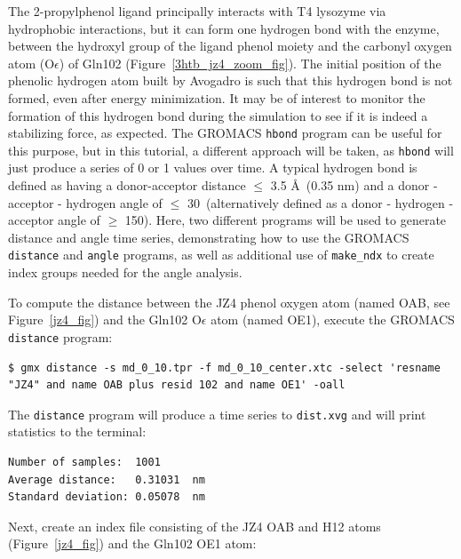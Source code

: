 \documentclass[9pt,tutorial,pubversion]{livecoms}
\begin{document}
The 2-propylphenol ligand principally interacts with T4 lysozyme via hydrophobic interactions, but it can form one hydrogen bond with the enzyme, between the hydroxyl group of the ligand phenol moiety and the carbonyl oxygen atom (O$\epsilon$) of Gln102 (Figure~\ref{3htb_jz4_zoom_fig}). The initial position of the phenolic hydrogen atom built by Avogadro is such that this hydrogen bond is not formed, even after energy minimization. It may be of interest to monitor the formation of this hydrogen bond during the simulation to see if it is indeed a stabilizing force, as expected. The GROMACS \texttt{hbond} program can be useful for this purpose, but in this tutorial, a different approach will be taken, as \texttt{hbond} will just produce a series of 0 or 1 values over time. A typical hydrogen bond is defined as having a donor-acceptor distance $\le$ 3.5 \AA~(0.35 nm) and a donor - acceptor - hydrogen angle of $\le$ 30\textdegree~(alternatively defined as a donor - hydrogen - acceptor angle of $\ge$ 150\textdegree). Here, two different programs will be used to generate distance and angle time series, demonstrating how to use the GROMACS \texttt{distance} and \texttt{angle} programs, as well as additional use of \texttt{make\_ndx} to create index groups needed for the angle analysis.

To compute the distance between the JZ4 phenol oxygen atom (named OAB, see Figure~\ref{jz4_fig}) and the Gln102 O$\epsilon$ atom (named OE1), execute the GROMACS \texttt{distance} program:

\begin{lstlisting}
$ gmx distance -s md_0_10.tpr -f md_0_10_center.xtc -select 'resname "JZ4" and name OAB plus resid 102 and name OE1' -oall
\end{lstlisting}
%
The \texttt{distance} program will produce a time series to \texttt{dist.xvg} and will print statistics to the terminal:

\begin{lstlisting}
Number of samples:  1001
Average distance:   0.31031  nm
Standard deviation: 0.05078  nm
\end{lstlisting}

Next, create an index file consisting of the JZ4 OAB and H12 atoms (Figure~\ref{jz4_fig}) and the Gln102 OE1 atom:
\end{document}
